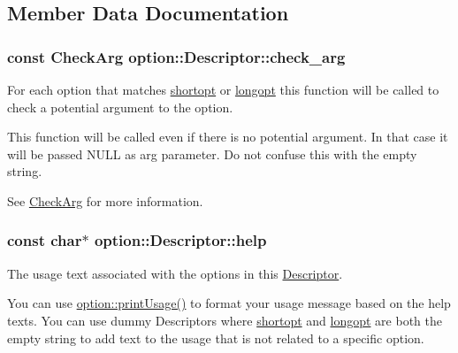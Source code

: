 \subsection{Member Data Documentation}
\subsubsection[{\texorpdfstring{check\+\_\+arg}{check_arg}}]{\setlength{\rightskip}{0pt plus 5cm}const {\bf Check\+Arg} option\+::\+Descriptor\+::check\+\_\+arg}\hypertarget{structoption_1_1Descriptor_aa5d675dba0214a4abd73007ff163cc67}{}\label{structoption_1_1Descriptor_aa5d675dba0214a4abd73007ff163cc67}


For each option that matches \hyperlink{structoption_1_1Descriptor_a0dba4ccca59c19d6ed4081391fca5adb}{shortopt} or \hyperlink{structoption_1_1Descriptor_a470c449dfa894c9bfda2dae026142b4b}{longopt} this function will be called to check a potential argument to the option. 

This function will be called even if there is no potential argument. In that case it will be passed {\ttfamily N\+U\+LL} as {\ttfamily arg} parameter. Do not confuse this with the empty string.

See \hyperlink{namespaceoption_a4cdf403efae65e18bf850e2001b12a2a}{Check\+Arg} for more information. 
\subsubsection[{\texorpdfstring{help}{help}}]{\setlength{\rightskip}{0pt plus 5cm}const char$\ast$ option\+::\+Descriptor\+::help}\hypertarget{structoption_1_1Descriptor_a9045b19311533e1b8a08645d57149c79}{}\label{structoption_1_1Descriptor_a9045b19311533e1b8a08645d57149c79}


The usage text associated with the options in this \hyperlink{structoption_1_1Descriptor}{Descriptor}. 

You can use \hyperlink{namespaceoption_afc8bb7e040a98a0b33ff1ce9da1be0d1}{option\+::print\+Usage()} to format your usage message based on the {\ttfamily help} texts. You can use dummy Descriptors where \hyperlink{structoption_1_1Descriptor_a0dba4ccca59c19d6ed4081391fca5adb}{shortopt} and \hyperlink{structoption_1_1Descriptor_a470c449dfa894c9bfda2dae026142b4b}{longopt} are both the empty string to add text to the usage that is not related to a specific option.

